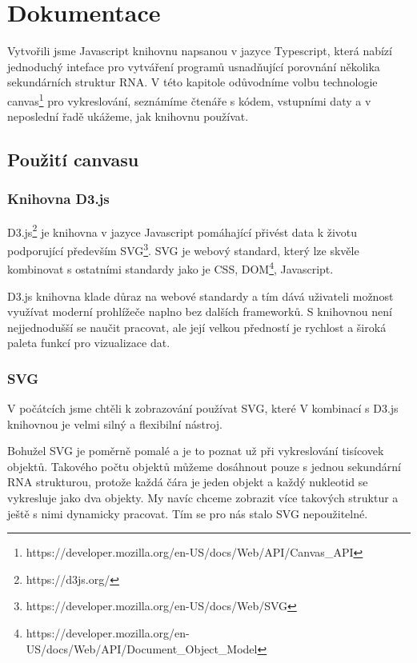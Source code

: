 \chapter{Dokumentace}

Vytvořili jsme Javascript knihovnu napsanou v jazyce Typescript, která nabízí
jednoduchý inteface pro vytváření programů usnadňující porovnání několika
sekundárních struktur RNA. V této kapitole odůvodníme volbu technologie
canvas\footnote{https://developer.mozilla.org/en-US/docs/Web/API/Canvas\_API}
pro vykreslování, seznámíme čtenáře s kódem, vstupními daty a v neposlední řadě
ukážeme, jak knihovnu používat.

\section{Použití canvasu} \label{canvas}

\subsection{Knihovna D3.js}

D3.js\footnote{https://d3js.org/} je knihovna v jazyce Javascript pomáhající
přivést data k životu podporující především
SVG\footnote{https://developer.mozilla.org/en-US/docs/Web/SVG}. SVG je webový
standard, který lze skvěle kombinovat s ostatními standardy jako je CSS,
DOM\footnote{https://developer.mozilla.org/en-US/docs/Web/API/Document\_Object\_Model},
Javascript.

D3.js knihovna klade důraz na webové standardy a tím dává uživateli možnost
využívat moderní prohlížeče naplno bez dalších frameworků. S knihovnou není
nejjednodušší se naučit pracovat, ale její velkou předností je rychlost a
široká paleta funkcí pro vizualizace dat.

\subsection{SVG}

V počátcích jsme chtěli k zobrazování používat SVG, které V kombinací s D3.js
knihovnou je velmi silný a flexibilní nástroj.

Bohužel SVG je poměrně pomalé a je to poznat už při vykreslování tisícovek
objektů. Takového počtu objektů můžeme dosáhnout pouze s jednou sekundární RNA
strukturou, protože každá čára je jeden objekt a každý nukleotid se vykresluje
jako dva objekty. My navíc chceme zobrazit více takových struktur a ještě s
nimi dynamicky pracovat. Tím se pro nás stalo SVG nepoužitelné.

